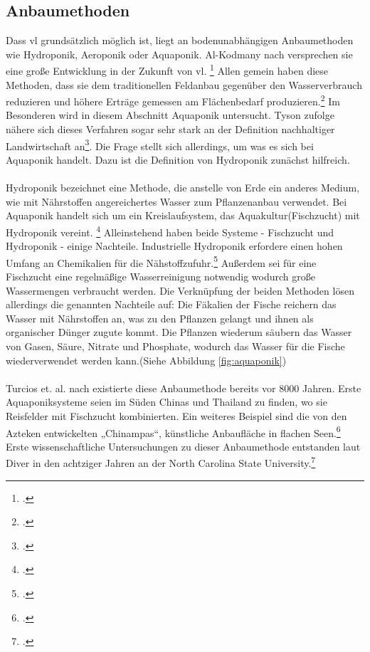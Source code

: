 \documentclass{scrartcl}
\begin{document}
\subsection{Anbaumethoden}
Dass \acs{vl} grundsätzlich möglich ist, liegt an bodenunabhängigen Anbaumethoden wie Hydroponik, Aeroponik oder Aquaponik. Al-Kodmany nach versprechen sie eine große Entwicklung in der Zukunft von \acs{vl}. \footcite[S.1]{Al-Kodmany2018TheCity} Allen gemein haben diese Methoden, dass sie dem traditionellen Feldanbau gegenüber den Wasserverbrauch reduzieren und höhere Erträge gemessen am Flächenbedarf produzieren.\footcite[Vgl.][S.7f]{Al-Kodmany2018TheCity} Im Besonderen wird in diesem Abschnitt Aquaponik untersucht. Tyson zufolge nähere sich dieses Verfahren sogar sehr stark an der Definition nachhaltiger Landwirtschaft an\footcite[Vgl.][S.36]{TysonV.2007ReconcilingMedium}. Die Frage stellt sich allerdings, um was es sich bei Aquaponik handelt. Dazu ist die Definition von Hydroponik zunächst hilfreich.\\
\\
Hydroponik bezeichnet eine Methode, die anstelle von Erde ein anderes Medium, wie mit Nährstoffen angereichertes Wasser zum Pflanzenanbau verwendet. Bei Aquaponik handelt sich um ein Kreislaufsystem, das Aquakultur(Fischzucht) mit Hydroponik vereint. \footcite[Vgl.][S.44f]{Spring2012DerBasel-Stadt} Alleinstehend haben beide Systeme - Fischzucht und Hydroponik - einige Nachteile. Industrielle Hydroponik erfordere einen hohen Umfang an Chemikalien für die Nähstoffzufuhr.\footcite[Vgl.][S.8]{Al-Kodmany2018TheCity} Außerdem sei für eine Fischzucht eine regelmäßige Wasserreinigung notwendig wodurch große Wassermengen verbraucht werden. Die Verknüpfung der beiden Methoden lösen allerdings die genannten Nachteile auf: Die Fäkalien der Fische reichern das Wasser mit Nährstoffen an, was zu den Pflanzen gelangt und ihnen als organischer Dünger zugute kommt. Die Pflanzen wiederum säubern das Wasser von Gasen, Säure, Nitrate und Phosphate, wodurch das Wasser für die Fische wiederverwendet werden kann.(Siehe Abbildung \ref{fig:aquaponik}) \\
\\
Turcios et. al. nach existierte diese Anbaumethode bereits vor 8000 Jahren. Erste Aquaponiksysteme seien im Süden Chinas und Thailand zu finden, wo sie Reisfelder mit Fischzucht kombinierten. Ein weiteres Beispiel sind die von den Azteken entwickelten „Chinampas“, künstliche Anbaufläche in flachen Seen.\footcite[Vgl.][S.838]{Turcios2014SustainableFuture} Erste wissenschaftliche Untersuchungen zu dieser Anbaumethode entstanden laut Diver in den achtziger Jahren an der North Carolina State University.\footcite[Vgl.][S.4]{Diver2006Aquaponics-IntegrationAquaculture} 
\end{document}
